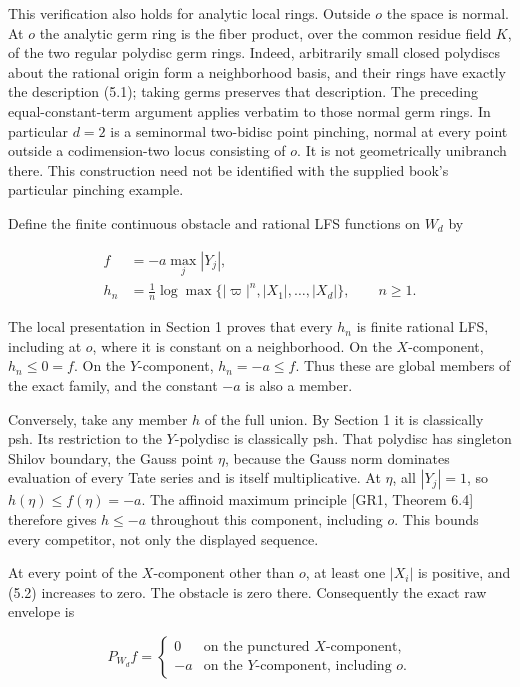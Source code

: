 \documentclass[11pt,a4paper]{article}
\begin{document}
This verification also holds for analytic local rings. Outside \(o\) the space is normal. At \(o\) the analytic germ ring is the fiber product, over the common residue field \(K\), of the two regular polydisc germ rings. Indeed, arbitrarily small closed polydiscs about the rational origin form a neighborhood basis, and their rings have exactly the description (5.1); taking germs preserves that description. The preceding equal-constant-term argument applies verbatim to those normal germ rings. In particular \(d=2\) is a seminormal two-bidisc point pinching, normal at every point outside a codimension-two locus consisting of \(o\). It is not geometrically unibranch there. This construction need not be identified with the supplied book's particular pinching example.

Define the finite continuous obstacle and rational LFS functions on \(W_d\) by

\[
\begin{split}
f&=-a\max_j |Y_j|,\\
h_n&=\frac1n\log\max\{|\varpi|^n,|X_1|,\ldots,|X_d|\},
\qquad n\geq1.
\end{split} \tag{5.2}
\]

The local presentation in Section 1 proves that every \(h_n\) is finite rational LFS, including at \(o\), where it is constant on a neighborhood. On the \(X\)-component, \(h_n\leq0=f\). On the \(Y\)-component, \(h_n=-a\leq f\). Thus these are global members of the exact family, and the constant \(-a\) is also a member.

Conversely, take any member \(h\) of the full union. By Section 1 it is classically psh. Its restriction to the \(Y\)-polydisc is classically psh. That polydisc has singleton Shilov boundary, the Gauss point \(\eta\), because the Gauss norm dominates evaluation of every Tate series and is itself multiplicative. At \(\eta\), all \(|Y_j|=1\), so \(h(\eta)\leq f(\eta)=-a\). The affinoid maximum principle [GR1, Theorem 6.4] therefore gives \(h\leq-a\) throughout this component, including \(o\). This bounds every competitor, not only the displayed sequence.

At every point of the \(X\)-component other than \(o\), at least one \(|X_i|\) is positive, and (5.2) increases to zero. The obstacle is zero there. Consequently the exact raw envelope is

\[
P_{W_d}f=
\begin{cases}
0&\text{on the punctured }X\text{-component},\\
-a&\text{on the }Y\text{-component, including }o.
\end{cases} \tag{5.3}
\]
\end{document}
